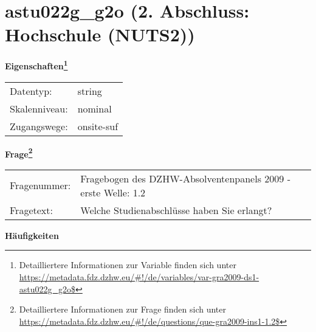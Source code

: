 
    \setcounter{footnote}{0}

    \vspace*{-1.8cm}
	\section{astu022g\_g2o (2. Abschluss: Hochschule (NUTS2))}
	\label{section:astu022g_g2o}



    \vspace*{0.5cm}
    \noindent\textbf{Eigenschaften\footnote{Detailliertere Informationen zur Variable finden sich unter
		\url{https://metadata.fdz.dzhw.eu/\#!/de/variables/var-gra2009-ds1-astu022g_g2o$}}}\\
	\begin{tabularx}{\hsize}{@{}lX}
	Datentyp: & string \\
	Skalenniveau: & nominal \\
	Zugangswege: &
	  onsite-suf
 \\
    \end{tabularx}



				\vspace*{0.5cm}
                \noindent\textbf{Frage\footnote{Detailliertere Informationen zur Frage finden sich unter
		              \url{https://metadata.fdz.dzhw.eu/\#!/de/questions/que-gra2009-ins1-1.2$}}}\\
				\begin{tabularx}{\hsize}{@{}lX}
					Fragenummer: &
					  Fragebogen des DZHW-Absolventenpanels 2009 - erste Welle:
					  1.2
 \\
					Fragetext: & Welche Studienabschlüsse haben Sie erlangt? \\
				\end{tabularx}





        		\vspace*{0.5cm}
                \noindent\textbf{Häufigkeiten}

